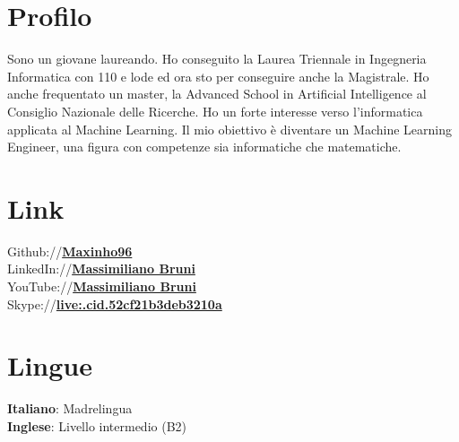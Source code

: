 \documentclass[]{deedy-resume-openfont}
\begin{document}
%
%

%
%

%
%

\begin{minipage}[t]{0.33\textwidth} 


\section{Profilo}
Sono un giovane laureando. Ho conseguito la Laurea Triennale in Ingegneria Informatica con 110 e lode ed ora sto per conseguire anche la Magistrale. Ho anche frequentato un master, la Advanced School in Artificial Intelligence al Consiglio Nazionale delle Ricerche. Ho un forte interesse verso l'informatica applicata al Machine Learning. Il mio obiettivo è diventare un Machine Learning Engineer, una figura con competenze sia informatiche che matematiche.
\sectionsep


\section{Link} 
Github://\href{https://github.com/Maxinho96}{\bf Maxinho96} \\
LinkedIn://\href{https://www.linkedin.com/in/massimiliano-bruni-352926120}{\bf Massimiliano Bruni} \\
YouTube://\href{https://www.youtube.com/channel/UCqskrALDsaUvYC8ztJyqCug}{\bf Massimiliano Bruni} \\
Skype://\href{https://join.skype.com/invite/w9MIsgXZsji7}{\bf live:.cid.52cf21b3deb3210a}
\sectionsep


\section{Lingue}
\textbf{Italiano}: Madrelingua \\
\textbf{Inglese}: Livello intermedio (B2)
\sectionsep


\end{minipage}
\end{document}
